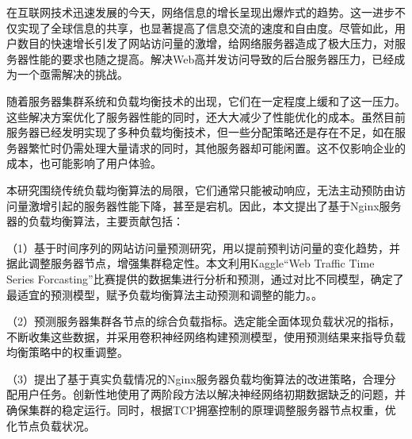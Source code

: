 \begin{cabstract}

	在互联网技术迅速发展的今天，网络信息的增长呈现出爆炸式的趋势。这一进步不仅实现了全球信息的共享，也显著提高了信息交流的速度和自由度。尽管如此，用户数目的快速增长引发了网站访问量的激增，给网络服务器造成了极大压力，对服务器性能的要求也随之提高。解决Web高并发访问导致的后台服务器压力，已经成为一个亟需解决的挑战。

	随着服务器集群系统和负载均衡技术的出现，它们在一定程度上缓和了这一压力。这些解决方案优化了服务器性能的同时，还大大减少了性能优化的成本。虽然目前服务器已经发明实现了多种负载均衡技术，但一些分配策略还是存在不足，如在服务器繁忙时仍需处理大量请求的同时，其他服务器却可能闲置。这不仅影响企业的成本，也可能影响了用户体验。

	本研究围绕传统负载均衡算法的局限，它们通常只能被动响应，无法主动预防由访问量激增引起的服务器性能下降，甚至是宕机。因此，本文提出了基于Nginx服务器的负载均衡算法，主要贡献包括：

	（1）基于时间序列的网站访问量预测研究，用以提前预判访问量的变化趋势，并据此调整服务器节点，增强集群稳定性。本文利用Kaggle“Web Traffic Time Series Forcasting”比赛提供的数据集进行分析和预测，通过对比不同模型，确定了最适宜的预测模型，赋予负载均衡算法主动预测和调整的能力。。

	（2）预测服务器集群各节点的综合负载指标。选定能全面体现负载状况的指标，不断收集这些数据，并采用卷积神经网络构建预测模型，使用预测结果来指导负载均衡策略中的权重调整。

	（3）提出了基于真实负载情况的Nginx服务器负载均衡算法的改进策略，合理分配用户任务。创新性地使用了两阶段方法以解决神经网络初期数据缺乏的问题，并确保集群的稳定运行。同时，根据TCP拥塞控制的原理调整服务器节点权重，优化节点负载状况。

\end{cabstract}


